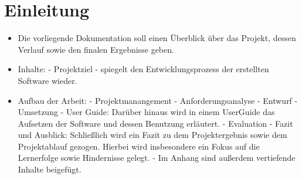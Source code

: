 \chapter{Einleitung}

\begin{itemize}
    \item Die vorliegende Dokumentation soll einen Überblick über das Projekt, dessen Verlauf sowie den finalen Ergebnisse geben.     \item Inhalte:
        \subitem - Projektziel
        \subitem - spiegelt den Entwicklungsprozess der erstellten Software wieder.
    \item Aufbau der Arbeit: 
        \subitem - Projektmanangement
        \subitem - Anforderungsanalyse
        \subitem - Entwurf
        \subitem - Umsetzung
        \subitem - User Guide: Darüber hinaus wird in einem UserGuide das Aufsetzen der Software und dessen Benutzung erläutert.
        \subitem - Evaluation
        \subitem - Fazit und Ausblick: Schließlich wird ein Fazit zu dem Projektergebnis sowie dem Projektablauf gezogen. Hierbei wird insbesondere ein Fokus auf die Lernerfolge sowie Hindernisse gelegt. 
        \subitem - Im Anhang sind außerdem vertiefende Inhalte beigefügt.
\end{itemize}